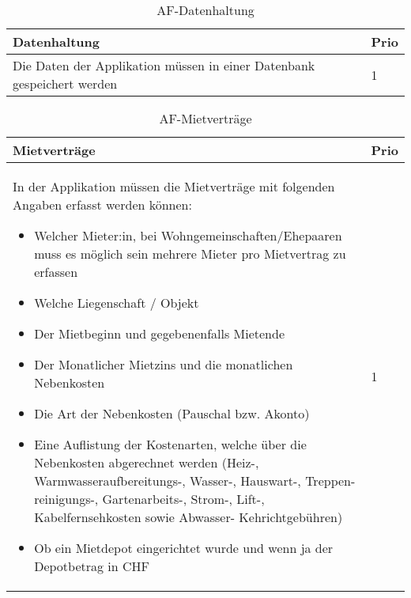 \begin{table}[H]
  \centering
  \settowidth{}
  \setlength\extrarowheight{2pt}
  \begin{tabulary}{1.0\textwidth}{|m{16cm}|L|}
    \hline
    \textbf{Datenhaltung}&\textbf{Prio}\\
    \hline
      Die Daten der Applikation müssen in einer Datenbank gespeichert werden & 1\\
    \hline
  \end{tabulary}
  \caption{AF-Datenhaltung}
  \label{afDatenhaltung}
\end{table}

\begin{table}[H]
  \centering
  \settowidth{}
  \setlength\extrarowheight{2pt}
  \begin{tabulary}{1.0\textwidth}{|m{16cm}|L|}
    \hline
    \textbf{Mietverträge}&\textbf{Prio}\\
    \hline
    In der Applikation müssen die Mietverträge mit folgenden Angaben erfasst werden können:
    \begin{itemize}
      \item Welcher Mieter:in, bei Wohngemeinschaften/Ehepaaren muss es möglich sein mehrere Mieter pro Mietvertrag zu erfassen
      \item Welche Liegenschaft / Objekt
      \item Der Mietbeginn und gegebenenfalls Mietende
      \item Der Monatlicher Mietzins und die monatlichen Nebenkosten
      \item Die Art der Nebenkosten (Pauschal bzw. Akonto)
      \item Eine Auflistung der Kostenarten, welche über die Nebenkosten abgerechnet werden (Heiz-, Warmwasseraufbereitungs-, Wasser-, Hauswart-, Treppen-reinigungs-, Gartenarbeits-, Strom-, Lift-, Kabelfernsehkosten sowie Abwasser- Kehrichtgebühren)
      \item Ob ein Mietdepot eingerichtet wurde und wenn ja der Depotbetrag in CHF
    \end{itemize}  & 1\\ 
    \hline
  \end{tabulary}
  \caption{AF-Mietverträge}
  \label{afMietverträge}
\end{table}

